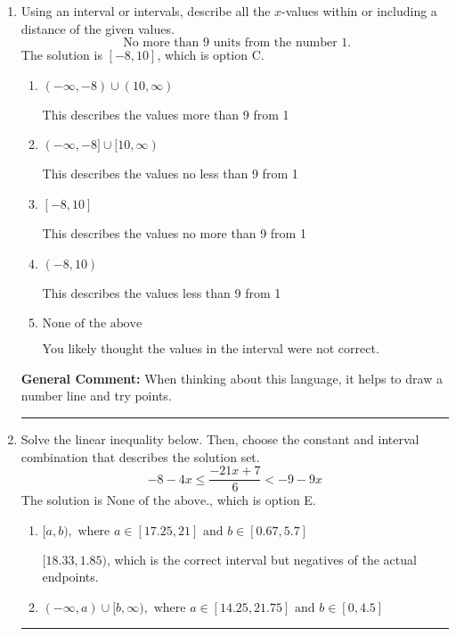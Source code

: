 \documentclass{extbook}[14pt]
\newcommand{\litem}[1]{\item #1

\rule{\textwidth}{0.4pt}}
\begin{document}
\begin{enumerate}
{\begin{enumerate}[label=\Alph*.]
 * Correct option.
\item \( (-\infty, a) \cup (b, \infty), \text{ where } a \in [-3.9, -0.6] \text{ and } b \in [2.25, 6] \)

Corresponds to inverting the inequality and negating the solution.
\item \( (-\infty, \infty) \)

Corresponds to the variable canceling, which does not happen in this instance.
\end{enumerate}

\textbf{General Comment:} When multiplying or dividing by a negative, flip the sign.
}
\litem{
Using an interval or intervals, describe all the $x$-values within or including a distance of the given values.
\[ \text{ No more than } 9 \text{ units from the number } 1. \]The solution is \( [-8, 10] \), which is option C.\begin{enumerate}[label=\Alph*.]
\item \( (-\infty, -8) \cup (10, \infty) \)

This describes the values more than 9 from 1
\item \( (-\infty, -8] \cup [10, \infty) \)

This describes the values no less than 9 from 1
\item \( [-8, 10] \)

This describes the values no more than 9 from 1
\item \( (-8, 10) \)

This describes the values less than 9 from 1
\item \( \text{None of the above} \)

You likely thought the values in the interval were not correct.
\end{enumerate}

\textbf{General Comment:} When thinking about this language, it helps to draw a number line and try points.
}
\litem{
Solve the linear inequality below. Then, choose the constant and interval combination that describes the solution set.
\[ -8 - 4 x \leq \frac{-21 x + 7}{6} < -9 - 9 x \]The solution is \( \text{None of the above.} \), which is option E.\begin{enumerate}[label=\Alph*.]
\item \( [a, b), \text{ where } a \in [17.25, 21] \text{ and } b \in [0.67, 5.7] \)

$[18.33, 1.85)$, which is the correct interval but negatives of the actual endpoints.
\item \( (-\infty, a) \cup [b, \infty), \text{ where } a \in [14.25, 21.75] \text{ and } b \in [0, 4.5] \)


\end{enumerate}}
\end{enumerate}
\end{document}
